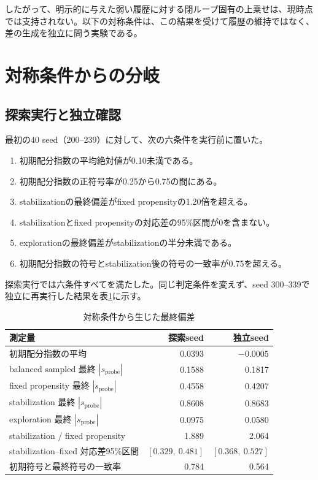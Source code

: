 \documentclass[11pt,a4paper]{ltjsarticle}
\begin{document}
したがって、明示的に与えた弱い履歴に対する閉ループ固有の上乗せは、現時点では支持されない。以下の対称条件は、この結果を受けて履歴の維持ではなく、差の生成を独立に問う実験である。

\section{対称条件からの分岐}

\subsection{探索実行と独立確認}

最初の40 seed（200--239）に対して、次の六条件を実行前に置いた。

\begin{enumerate}
\item 初期配分指数の平均絶対値が0.10未満である。
\item 初期配分指数の正符号率が0.25から0.75の間にある。
\item stabilizationの最終偏差がfixed propensityの1.20倍を超える。
\item stabilizationとfixed propensityの対応差の95\%区間が0を含まない。
\item explorationの最終偏差がstabilizationの半分未満である。
\item 初期配分指数の符号とstabilization後の符号の一致率が0.75を超える。
\end{enumerate}

探索実行では六条件すべてを満たした。同じ判定条件を変えず、seed 300--339で独立に再実行した結果を表\ref{tab:symmetry}に示す。

\begin{table}[ht]
\centering
\caption{対称条件から生じた最終偏差}
\label{tab:symmetry}
\begin{tabular}{lrr}
\toprule
測定量 & 探索seed & 独立seed \\
\midrule
初期配分指数の平均 & 0.0393 & $-0.0005$ \\
balanced sampled 最終 $|s_{\mathrm{probe}}|$ & 0.1588 & 0.1817 \\
fixed propensity 最終 $|s_{\mathrm{probe}}|$ & 0.4558 & 0.4207 \\
stabilization 最終 $|s_{\mathrm{probe}}|$ & 0.8608 & 0.8683 \\
exploration 最終 $|s_{\mathrm{probe}}|$ & 0.0975 & 0.0580 \\
stabilization / fixed propensity & 1.889 & 2.064 \\
stabilization--fixed 対応差95\%区間 & $[0.329,\ 0.481]$ & $[0.368,\ 0.527]$ \\
初期符号と最終符号の一致率 & 0.784 & 0.564 \\
\bottomrule
\end{tabular}
\end{table}
\end{document}
